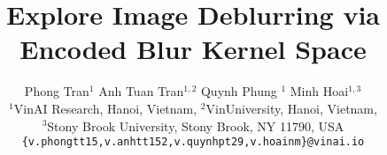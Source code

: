 \documentclass[final]{cvpr}
\begin{document}
\title{Explore Image Deblurring via Encoded Blur Kernel Space}

\author{
Phong Tran$^{1}$ \quad Anh Tuan Tran$^{1,2}$ \quad Quynh Phung $^{1}$ \quad Minh Hoai$^{1,3}$ \\
$^1$VinAI Research, Hanoi, Vietnam,
$^2$VinUniversity, Hanoi, Vietnam,\\
$^3$Stony Brook University, Stony Brook, NY 11790, USA\\
{\tt\small \{v.phongtt15,v.anhtt152,v.quynhpt29,v.hoainm\}@vinai.io}
}

\maketitle


\end{document}
